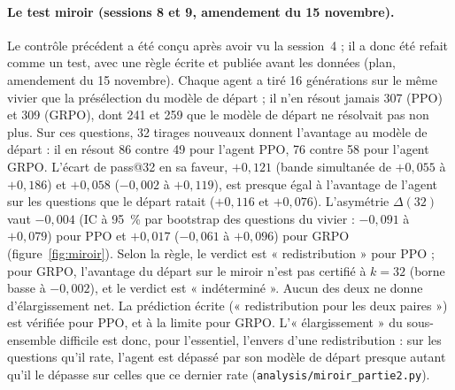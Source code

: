 \paragraph{Le test miroir (sessions 8 et 9, amendement du 15 novembre).} Le contrôle précédent a été conçu après avoir vu la session~4 ; il a donc été refait comme un test, avec une règle écrite et publiée avant les données (plan, amendement du 15 novembre). Chaque agent a tiré 16 générations sur le même vivier que la présélection du modèle de départ ; il n'en résout jamais 307 (PPO) et 309 (GRPO), dont 241 et 259 que le modèle de départ ne résolvait pas non plus. Sur ces questions, 32 tirages nouveaux donnent l'avantage au modèle de départ : il en résout 86 contre 49 pour l'agent PPO, 76 contre 58 pour l'agent GRPO. L'écart de pass@32 en sa faveur, $+0{,}121$ (bande simultanée de $+0{,}055$ à $+0{,}186$) et $+0{,}058$ ($-0{,}002$ à $+0{,}119$), est presque égal à l'avantage de l'agent sur les questions que le départ ratait ($+0{,}116$ et $+0{,}076$). L'asymétrie $\Delta(32)$ vaut $-0{,}004$ (IC à 95~\% par bootstrap des questions du vivier : $-0{,}091$ à $+0{,}079$) pour PPO et $+0{,}017$ ($-0{,}061$ à $+0{,}096$) pour GRPO (figure~\ref{fig:miroir}). Selon la règle, le verdict est « redistribution » pour PPO ; pour GRPO, l'avantage du départ sur le miroir n'est pas certifié à $k = 32$ (borne basse à $-0{,}002$), et le verdict est « indéterminé ». Aucun des deux ne donne d'élargissement net. La prédiction écrite (« redistribution pour les deux paires ») est vérifiée pour PPO, et à la limite pour GRPO. L'« élargissement » du sous-ensemble difficile est donc, pour l'essentiel, l'envers d'une redistribution : sur les questions qu'il rate, l'agent est dépassé par son modèle de départ presque autant qu'il le dépasse sur celles que ce dernier rate (\texttt{analysis/miroir\_partie2.py}).

